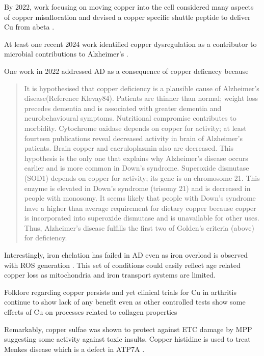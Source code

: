 {By 2022,  work focusing on moving copper into the cell considered
many aspects of copper misallocation and devised a copper specific
shuttle peptide to deliver Cu from abeta  \cite{D2SC02593K}.

At least one recent 2024 work  identified copper dysregulation as a contributor
to microbial contributions to Alzheimer's \cite{PMC11480022}.


One work in  2022 addressed
AD as a consequence of copper deficnecy because
\cite{Klevay_contemporaneous_epidemic_2022}
\begin{quote}
It is hypothesised that copper deficiency is a plausible cause of Alzheimer's
disease(Reference Klevay84). Patients are thinner than normal; weight loss
precedes dementia and is associated with greater dementia and neurobehavioural
symptoms. Nutritional compromise contributes to morbidity. Cytochrome oxidase
depends on copper for activity; at least fourteen publications reveal decreased
activity in brain of Alzheimer's patients. Brain copper and caeruloplasmin
also are decreased. This hypothesis is the only one that explains why Alzheimer's
disease occurs earlier and is more common in Down's syndrome. Superoxide
dismutase (SOD1) depends on copper for activity; its gene is on chromosome
21. This enzyme is elevated in Down's syndrome (trisomy 21) and is decreased
in people with monosomy. It seems likely that people with Down's syndrome
have a higher than average requirement for dietary copper because copper
is incorporated into superoxide dismutase and is unavailable for other uses.
Thus, Alzheimer's disease fulfills the first two of Golden's criteria (above)
for deficiency.

\end{quote}

Interestingly, iron chelation has failed in AD
even as iron overload is observed with ROS generation
\cite{PMID39031369}. This set of conditions could easily
reflect age related copper loss as mitochondria and iron 
transport systems are limited. 

Folklore regarding copper persists and yet clinical trials
for Cu in arthritis continue to show lack of any benefit
\cite{10.1371/journal.pone.0071529}
even as other controlled tests show some effects of Cu on
processes related to collagen properties
\cite{PMID6110524}

Remarkably, copper sulfae was shown to protect against
ETC damage by MPP \cite{RUBIOOSORNIO20171} suggesting
some activity against toxic insults.
Copper histidine is used to treat Menkes disease
which is a defect in ATP7A
\cite{Munakata_Sakamoto_Kitamura_effects_copper_2005}.



}
